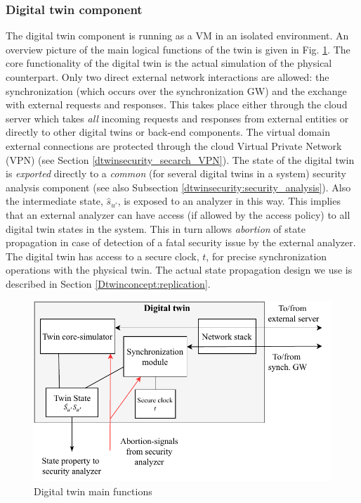 \subsubsection{Digital twin component} The digital twin component is running as a VM in an isolated environment. An overview picture of the main logical functions of the twin is given in Fig. \ref{figure:dtwin_security_architecture}. The core functionality of the digital twin is the actual simulation of the physical counterpart. Only two direct external network interactions are allowed: the synchronization (which occurs over the synchronization GW) and the exchange with external requests and responses. This takes place either through the cloud server which takes \textit{all} incoming requests and responses from external entities or directly to other digital twins or back-end components. The virtual domain external connections are protected through the cloud Virtual Private Network (VPN) (see Section \ref{dtwinsecurity_secarch_VPN}). The state of the digital twin is \textit{exported} directly to a \textit{common} (for several digital twins in a system) security analysis component (see also Subsection \ref{dtwinsecurity:security_analysis}). Also the intermediate state, $\hat{s}_{u'}$, is exposed to an analyzer in this way. This implies that an external analyzer can have access (if allowed by the access policy) to all digital twin states in the system. This in turn allows \textit{abortion} of state propagation in case of detection of a fatal security issue by the external analyzer. The digital twin has access to a secure clock, $t$, for precise synchronization operations with the physical twin.  The actual state propagation design we use is described in Section \ref{Dtwinconcept:replication}.

\begin{figure}[ht]
   \centering
    \includegraphics[scale=0.65]{papers/digital-twin/images/FIG4_TII-19-1326}
    \caption{Digital twin main functions}
    \label{figure:dtwin_security_architecture}
\end{figure}

